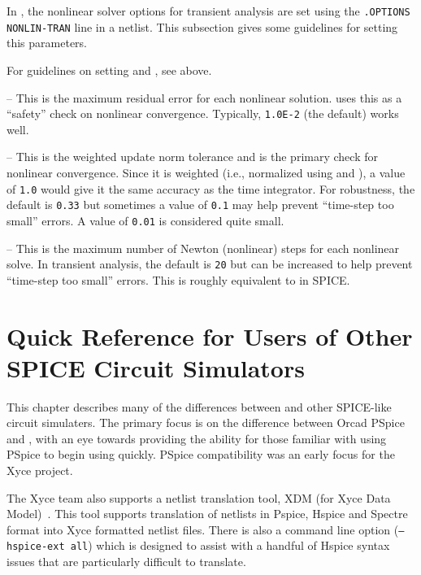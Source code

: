 In \Xyce{}, the nonlinear solver options for transient analysis are set using
the \texttt{.OPTIONS NONLIN-TRAN} line in a netlist.  This subsection gives
some guidelines for setting this parameters.
\begin{XyceItemize}
\item For guidelines on setting  and , see above.
\item {} -- This is the maximum residual error for each nonlinear
  solution.  \Xyce{} uses this as a ``safety'' check on nonlinear
  convergence.  Typically, \texttt{1.0E-2} (the default) works well.
\item {} -- This is the weighted update norm tolerance and is
  the primary check for nonlinear convergence.  Since it is weighted (i.e.,
  normalized using  and \mbox{}), a value of
  \texttt{1.0} would give it the same accuracy as the time integrator.  For
  robustness, the default is \texttt{0.33} but sometimes a value of
  \texttt{0.1} may help prevent ``time-step too small'' errors.  A value of
  \texttt{0.01} is considered quite small.
\item {} -- This is the maximum number of Newton (nonlinear)
  steps for each nonlinear solve.  In transient analysis, the default is
  \texttt{20} but can be increased to help prevent ``time-step too small''
  errors.  This is roughly equivalent to  in SPICE.
\end{XyceItemize}

\chapter{Quick Reference for Users of Other SPICE 
Circuit Simulators}
\label{PSpice_Ref}

This chapter describes many of the differences between \Xyce{} and
other SPICE-like circuit simulaters.  The primary focus is on the difference
between Orcad PSpice and \Xyce{}, with an eye towards providing the ability for those
familiar with using PSpice to begin using \Xyce{} quickly.   PSpice compatibility 
was an early focus for the Xyce project.

The Xyce team also supports a netlist translation tool, XDM (for Xyce Data 
Model)~\cite{XDMv2.3}.  This tool supports translation of netlists in Pspice, 
Hspice and Spectre format into Xyce formatted netlist files.  There is also a 
\Xyce{} command line option (\texttt{--hspice-ext all}) which is designed to 
assist with a handful of Hspice syntax issues that are particularly 
difficult to translate.

